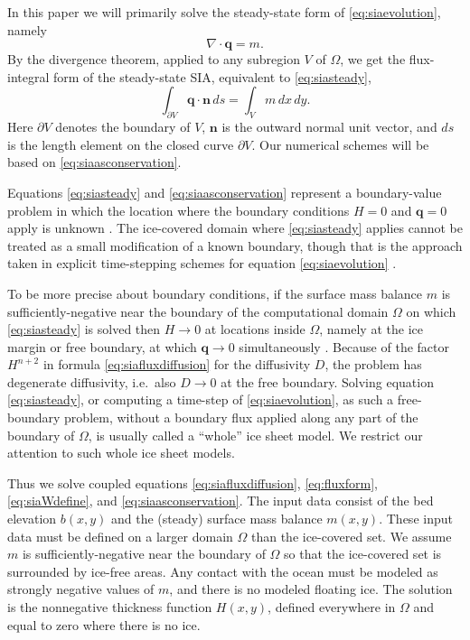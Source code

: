 \documentclass[twocolumn,a4paper]{igs}
\newcommand\bn{\mathbf{n}}
\newcommand\bq{\mathbf{q}}
\newcommand{\Div}{\nabla\cdot}
\begin{document}
In this paper we will primarily solve the steady-state form of \eqref{eq:siaevolution}, namely
\begin{equation}
\Div \bq = m.  \label{eq:siasteady}
\end{equation}
By the divergence theorem, applied to any subregion $V$ of $\Omega$, we get the flux-integral form of the steady-state SIA, equivalent to \eqref{eq:siasteady},
\begin{equation}
  \int_{\partial V} \bq \cdot \bn\,ds = \int_V m\, dx\,dy. \label{eq:siaasconservation}
\end{equation}
Here $\partial V$ denotes the boundary of $V$, $\bn$ is the outward normal unit vector, and $ds$ is the length element on the closed curve $\partial V$.  Our numerical schemes will be based on \eqref{eq:siaasconservation}.

Equations \eqref{eq:siasteady} and \eqref{eq:siaasconservation} represent a boundary-value problem in which the location where the boundary conditions $H=0$ and $\bq=0$ apply is unknown \citep{JouvetBueler2012,JaroschSchoofAnslow2013}.  The ice-covered domain where \eqref{eq:siasteady} applies cannot be treated as a small modification of a known boundary, though that is the approach taken in explicit time-stepping schemes for equation \eqref{eq:siaevolution} \citep{Huybrechtsetal1996,Bueleretal2005}.

To be more precise about boundary conditions, if the surface mass balance $m$ is sufficiently-negative near the boundary of the computational domain $\Omega$ on which \eqref{eq:siasteady} is solved then $H\to 0$ at locations inside $\Omega$, namely at the ice margin or free boundary, at which $\bq \to 0$ simultaneously \citep{JouvetBueler2012}.  Because of the factor $H^{n+2}$ in formula \eqref{eq:siafluxdiffusion} for the diffusivity $D$, the problem has degenerate diffusivity, i.e.~also $D \to 0$ at the free boundary.  Solving equation \eqref{eq:siasteady}, or computing a time-step of \eqref{eq:siaevolution}, as such a free-boundary problem, without a boundary flux applied along any part of the boundary of $\Omega$, is usually called a ``whole'' ice sheet model.  We restrict our attention to such whole ice sheet models.

Thus we solve coupled equations \eqref{eq:siafluxdiffusion}, \eqref{eq:fluxform}, \eqref{eq:siaWdefine}, and \eqref{eq:siaasconservation}.  The input data consist of the bed elevation $b(x,y)$ and the (steady) surface mass balance $m(x,y)$.  These input data must be defined on a larger domain $\Omega$ than the ice-covered set.  We assume $m$ is sufficiently-negative near the boundary of $\Omega$ so that the ice-covered set is surrounded by ice-free areas.  Any contact with the ocean must be modeled as strongly negative values of $m$, and there is no modeled floating ice.  The solution is the nonnegative thickness function $H(x,y)$, defined everywhere in $\Omega$ and equal to zero where there is no ice.
\end{document}
